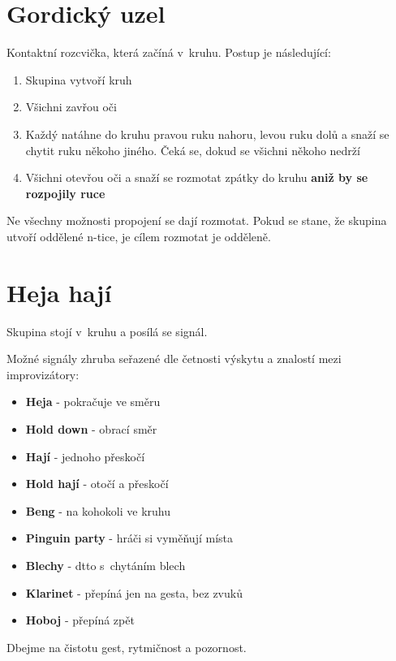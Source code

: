  
 
\needspace{5cm} \section{Gordický uzel} \label{gordický uzel} Kontaktní rozcvička, která začíná v~kruhu. Postup je následující: 
 
\begin{enumerate}
\item  Skupina vytvoří kruh
\item  Všichni zavřou oči
\item  Každý natáhne do kruhu pravou ruku nahoru, levou ruku dolů a snaží se chytit ruku někoho jiného. Čeká se, dokud se všichni někoho nedrží
\item  Všichni otevřou oči a snaží se rozmotat zpátky do kruhu \textbf{aniž by se rozpojily ruce}
\end{enumerate}
 
Ne všechny možnosti propojení se dají rozmotat. Pokud se stane, že skupina utvoří oddělené n-tice, je cílem rozmotat je odděleně. 
 
 
 
 
 
\needspace{5cm} \section{Heja hají} \label{heja hají} Skupina stojí v~kruhu a posílá se signál. 
 
Možné signály zhruba seřazené dle četnosti výskytu a znalostí mezi improvizátory: 
\begin{itemize}
\item \textbf{Heja} - pokračuje ve směru
\item \textbf{Hold down} - obrací směr
\item \textbf{Hají} - jednoho přeskočí
\item \textbf{Hold hají} - otočí a přeskočí
\item \textbf{Beng} - na kohokoli ve kruhu
\item \textbf{Pinguin party} - hráči si vyměňují místa
\item \textbf{Blechy} -  dtto s~chytáním blech
\item \textbf{Klarinet} -  přepíná jen na gesta, bez zvuků
\item \textbf{Hoboj} - přepíná zpět
\end{itemize}
 
Dbejme na čistotu gest, rytmičnost a pozornost. 
 
